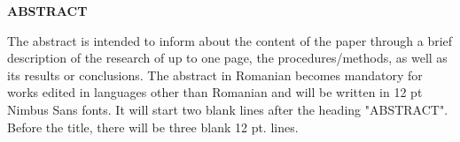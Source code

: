 \thispagestyle{abstractpagestyle}

\vspace*{36pt}

\begin{center}
\textbf{\fontsize{20pt}{24pt} \selectfont ABSTRACT}
\end{center}

\vspace{24pt}

The abstract is intended to inform about the content of the paper through a brief description of the research of up to one page, the procedures/methods, as well as its results or conclusions. The abstract in Romanian becomes mandatory for works edited in languages other than Romanian and will be written in 12 pt Nimbus Sans fonts. It will start two blank lines after the heading "ABSTRACT". Before the title, there will be three blank 12 pt. lines.

\vfill